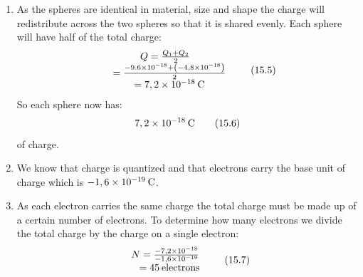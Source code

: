 {\begin{mdframed}[linewidth=4, leftmargin=40, rightmargin=40]
\begin{exercise}
\begin{enumerate}[noitemsep, label=\textbf{Step} \textbf{\arabic*}. ]
\begin{equation}
      \end{equation}
    \item \newline
     As the spheres are identical in material, size and shape the charge will redistribute across the two spheres so that it is shared evenly. Each sphere will have half of the total charge:
\label{m38781*id3231}\nopagebreak\noindent{}
    \begin{equation}
    \begin{array}{ccc}Q=\frac{{Q}_{1}+{Q}_{2}}{2}\\ \phantom{x}=\frac{-9.6\ensuremath{\times}{10}^{-18}+\left(-4,8\ensuremath{\times}{10}^{-18}\right)}{2}\\ \phantom{x}=7,2\ensuremath{\times}{10}^{-18}\phantom{\rule{2pt}{0ex}}\mathrm{C}\end{array}\tag{15.5}
      \end{equation}
 So each sphere now has: 
\label{m38781*id61212}\nopagebreak\noindent{}
    \begin{equation}
    7,2\ensuremath{\times}{10}^{-18}\phantom{\rule{2pt}{0ex}}\mathrm{C}\tag{15.6}
      \end{equation}
     of charge.\item \newline
     We know that charge is quantized and that electrons carry the base unit of charge which is $-1,6\ensuremath{\times}{10}^{-19}\phantom{\rule{2pt}{0ex}}\mathrm{C}$.\item \newline
     As each electron carries the same charge the total charge must be made up of a certain number of electrons. To determine how many electrons we divide the total charge by the charge on a single electron:
\label{m38781*id5121}\nopagebreak\noindent{}
    \begin{equation}
    \begin{array}{ccc}N=\frac{-7,2\ensuremath{\times}{10}^{-18}}{-1,6\ensuremath{\times}{10}^{-19}}\\ \phantom{x}=45\phantom{\rule{2pt}{0ex}}\mathrm{electrons}\end{array}\tag{15.7}
      \end{equation}
    \end{enumerate}
    \end{exercise}
    \end{mdframed}
    }
    \noindent
\label{m38781*cid9}
